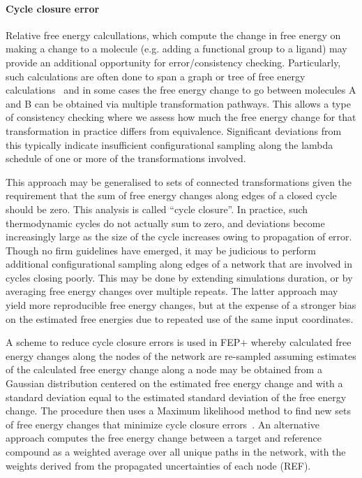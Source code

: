\documentclass[9pt,bestpractices]{livecoms}
\begin{document}
\paragraph{Cycle closure error}
Relative free energy calcullations, which compute the change in free energy on making a change to a molecule (e.g. adding a functional group to a ligand) may provide an additional opportunity for error/consistency checking. Particularly, such calculations are often done to span a graph or tree of free energy calculations~\cite{LOMAP paper from Mobley group; Schrodinger 2015 JACS paper} and in some cases the free energy change to go between molecules A and B can be obtained via multiple transformation pathways. This allows a type of consistency checking where we assess how much the free energy change for that transformation in practice differs from equivalence. Significant deviations from this typically indicate insufficient configurational sampling along the lambda schedule of one or more of the transformations involved.

This approach may be generalised to sets of connected transformations given the requirement that the sum of free energy changes along edges of a closed cycle should be zero. This analysis is called ``cycle closure''. In practice, such thermodynamic cycles do not actually sum to zero,  and deviations become increasingly large as the size of the cycle increases owing to propagation of error. Though no firm guidelines have emerged, it may be judicious to perform additional configurational sampling along edges of a network that are involved in cycles closing poorly. This may be done by extending simulations duration, or by averaging free energy changes over multiple repeats. The latter approach may yield more reproducible free energy changes, but at the expense of a stronger bias on the estimated free energies due to repeated use of the same input coordinates.

A scheme to reduce cycle closure errors is used in FEP+ whereby calculated free energy changes along the nodes of the network are re-sampled assuming estimates of the calculated free energy change along a node may be obtained from a Gaussian distribution centered on the estimated free energy change and with a standard deviation equal to the estimated standard deviation of the free energy change. The procedure then uses a Maximum likelihood method to find new sets of free energy changes that minimize cycle closure errors~\cite{REF}. An alternative approach computes the free energy change between a target and reference compound as a weighted average over all unique paths in the network, with the weights derived from the propagated uncertainties of each node (REF). 
\end{document}
